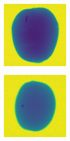 \documentclass[11pt]{article}
\begin{document}
\begin{figure}[!h]
\begin{subfigure}[b]{0.22\textwidth}
         \caption{}
         \label{fig:metal_39}
     \end{subfigure}
               \\
    \begin{subfigure}[b]{0.22\textwidth}
         \centering
         \includegraphics[width=\textwidth]{figurer/potato_dataset/metal/metal_40.jpg}
         \caption{}
         \label{fig:metal_40}
     \end{subfigure}
     \hfill
     \begin{subfigure}[b]{0.22\textwidth}
         \centering
         \includegraphics[width=\textwidth]{figurer/potato_dataset/metal/metal_41.jpg}

\end{subfigure}
\end{figure}
\end{document}
